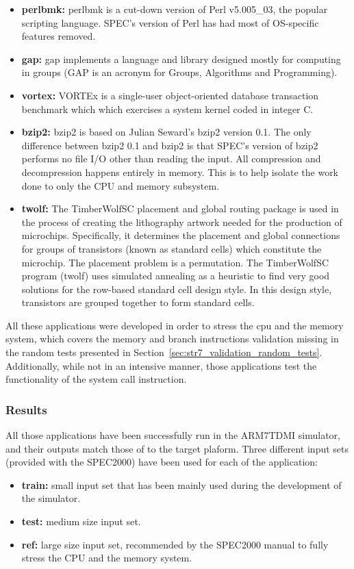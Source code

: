 \begin{itemize}
	\item \textbf{perlbmk:} perlbmk is a cut-down version of Perl v5.005\_03, the popular scripting language. SPEC's version of Perl has had most of OS-specific features removed.
	\item \textbf{gap:} gap implements a language and library designed mostly for computing in groups (GAP is an acronym for Groups, Algorithms and Programming).
	\item \textbf{vortex:} VORTEx is a single-user object-oriented database transaction benchmark  which which exercises a system kernel coded in integer C.
	\item \textbf{bzip2:} bzip2 is based on Julian Seward's bzip2 version 0.1. The only difference between bzip2 0.1 and bzip2 is that SPEC's version of bzip2 performs no file I/O other than reading the input. All compression and decompression happens entirely in memory. This is to help isolate the work done to only the CPU and memory subsystem.
	\item \textbf{twolf:} The TimberWolfSC placement and global routing package is used in the process of creating the lithography artwork needed for the production of microchips. Specifically, it determines the placement and global connections for groups of transistors (known as standard cells) which constitute the microchip. The placement problem is a permutation. The TimberWolfSC program (twolf) uses simulated annealing as a heuristic to find very good solutions for the row-based standard cell design style.  In this design style, transistors are grouped together to form standard cells.
\end{itemize}

All these applications were developed in order to stress the cpu and the memory system, which covers the memory and branch instructions validation missing in the random tests presented in Section~\ref{sec:str7_validation_random_tests}. 
Additionally, while not in an intensive manner, those applications test the functionality of the system call instruction.

\subsubsection{Results}

All those applications have been successfully run in the ARM7TDMI simulator, and their outputs match those of to the target plaform.
Three different input sets (provided with the SPEC2000) have been used for each of the application:
\begin{itemize}
	\item \textbf{train:} small input set that has been mainly used during the development of the simulator.
	\item \textbf{test:} medium size input set.
	\item \textbf{ref:} large size input set, recommended by the SPEC2000 manual to fully stress the CPU and the memory system.
\end{itemize}

